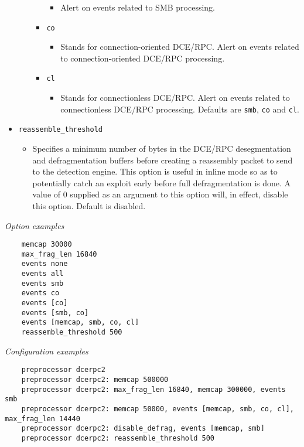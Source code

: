 \documentclass[english]{report}
\begin{document}
\begin{itemize}
\begin{itemize}
\begin{itemize}
\begin{itemize}
\item[] Alert on events related to SMB processing.
\end{itemize}

\item[] \texttt{co}

\begin{itemize}

\item[] Stands for connection-oriented DCE/RPC. Alert on events related to
connection-oriented DCE/RPC processing.

\end{itemize}

\item[] \texttt{cl}
\begin{itemize}

\item[] Stands for connectionless DCE/RPC. Alert on events related to
connectionless DCE/RPC processing.  Defaults are \texttt{smb}, \texttt{co} and
\texttt{cl}.

\end{itemize}
\end{itemize}
\end{itemize}

\item[] \texttt{reassemble\_threshold}
\begin{itemize}

\item[] Specifies a minimum number of bytes in the DCE/RPC desegmentation and
defragmentation buffers before creating a reassembly packet to send to the
detection engine. This option is useful in inline mode so as to potentially
catch an exploit early before full defragmentation is done.  A value of 0
supplied as an argument to this option will, in effect, disable this option.
Default is disabled.

\end{itemize}
\end{itemize}

\textit{Option examples}
\footnotesize
\begin{verbatim}
    memcap 30000
    max_frag_len 16840
    events none
    events all
    events smb
    events co
    events [co]
    events [smb, co]
    events [memcap, smb, co, cl]
    reassemble_threshold 500
\end{verbatim}
\normalsize

\textit{Configuration examples}
\footnotesize
\begin{verbatim}
    preprocessor dcerpc2
    preprocessor dcerpc2: memcap 500000
    preprocessor dcerpc2: max_frag_len 16840, memcap 300000, events smb
    preprocessor dcerpc2: memcap 50000, events [memcap, smb, co, cl], max_frag_len 14440
    preprocessor dcerpc2: disable_defrag, events [memcap, smb]
    preprocessor dcerpc2: reassemble_threshold 500
\end{verbatim}
\normalsize
\end{document}
